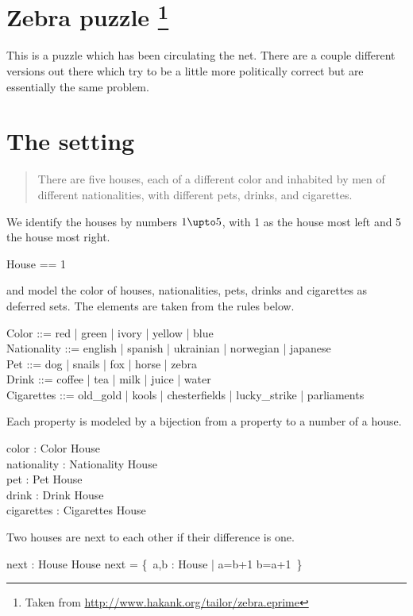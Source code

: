 \documentclass{article}
\begin{document}


\section*{Zebra puzzle%
\footnote{Taken from \url{http://www.hakank.org/tailor/zebra.eprime}}}
This is a puzzle which has been circulating the net. There are a couple
different versions out there which try to be a little more politically
correct but are essentially the same problem.    

\section{The setting}
\begin{quote}
  There are five houses, each of a different color and inhabited by
  men of different nationalities, with different pets, drinks,
  and cigarettes.
\end{quote}
We identify the houses by numbers $1\upto 5$, with 1 as the house most left and
5 the house most right.
\begin{zed}
  House == 1 \\
\end{zed}
and model the color of houses, nationalities, pets, drinks and cigarettes as deferred
sets. The elements are taken from the rules below.
\begin{zed}
  Color ::= red | green | ivory | yellow | blue \\
  Nationality ::= english | spanish | ukrainian | norwegian | japanese \\
  Pet ::= dog | snails | fox | horse | zebra \\
  Drink ::= coffee | tea | milk | juice | water \\
  Cigarettes ::= old\_gold | kools | chesterfields | lucky\_strike | parliaments \\
\end{zed}
Each property is modeled by a bijection from a property to a number of a house.
\begin{axdef}
  color : Color \bij House \\
  nationality : Nationality \bij House \\
  pet : Pet \bij House \\
  drink : Drink \bij House \\
  cigarettes : Cigarettes \bij House \\
\end{axdef}
Two houses are next to each other if their difference is one.
\begin{axdef}
  next : House \rel House
  \where
  next = \{~a,b : House | a=b+1 \lor b=a+1~\}
\end{axdef}
\end{document}
